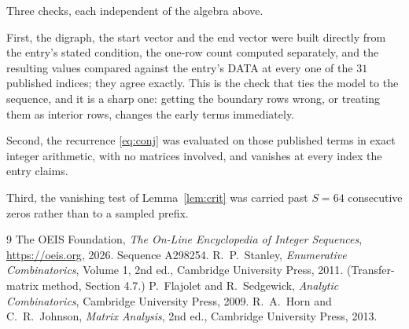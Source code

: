 \documentclass[11pt,a4paper]{article}
\theoremstyle{plain}
\theoremstyle{definition}
\begin{document}
Three checks, each independent of the algebra above.

First, the digraph, the start vector and the end vector were built directly from the
entry's stated condition, the one-row count computed separately, and the resulting values
compared against the entry's DATA at every one of the $31$ published indices; they
agree exactly. This is the check that ties the model to the sequence, and it is a sharp one:
getting the boundary rows wrong, or treating them as interior rows, changes the early terms
immediately.

Second, the recurrence \eqref{eq:conj} was evaluated on those published terms in exact
integer arithmetic, with no matrices involved, and vanishes at every index the entry claims.

Third, the vanishing test of Lemma~\ref{lem:crit} was carried past $S=64$ consecutive
zeros rather than to a sampled prefix.

\begin{thebibliography}{9}
 The OEIS Foundation, \emph{The On-Line Encyclopedia of Integer
Sequences}, \url{https://oeis.org}, 2026. Sequence A298254.
 R.~P.~Stanley, \emph{Enumerative Combinatorics}, Volume 1, 2nd ed.,
Cambridge University Press, 2011. (Transfer-matrix method, Section 4.7.)
 P.~Flajolet and R.~Sedgewick, \emph{Analytic Combinatorics}, Cambridge
University Press, 2009.
 R.~A.~Horn and C.~R.~Johnson, \emph{Matrix Analysis}, 2nd ed., Cambridge
University Press, 2013.
\end{thebibliography}
\end{document}
